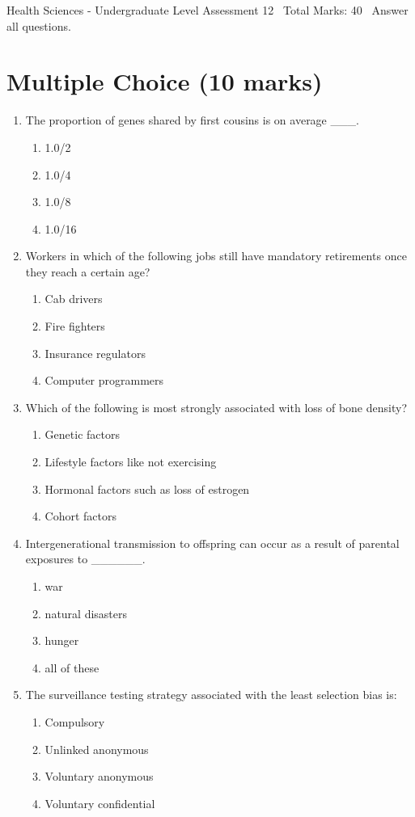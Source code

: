 \documentclass[12pt]{article}
\begin{document}
\begin{center}
Health Sciences - Undergraduate Level Assessment 12 \
Total Marks: 40 \
Answer all questions.
\end{center}

\section*{Multiple Choice (10 marks)}
\begin{enumerate}[label=\arabic*.]
\item The proportion of genes shared by first cousins is on average \_\_\_.
\begin{enumerate}[label=(\alph*)]
    \item 1.0/2
    \item 1.0/4
    \item 1.0/8
    \item 1.0/16
\end{enumerate}
\item Workers in which of the following jobs still have mandatory retirements once they reach a certain age?
\begin{enumerate}[label=(\alph*)]
    \item Cab drivers
    \item Fire fighters
    \item Insurance regulators
    \item Computer programmers
\end{enumerate}
\item Which of the following is most strongly associated with loss of bone density?
\begin{enumerate}[label=(\alph*)]
    \item Genetic factors
    \item Lifestyle factors like not exercising
    \item Hormonal factors such as loss of estrogen
    \item Cohort factors
\end{enumerate}
\item Intergenerational transmission to offspring can occur as a result of parental exposures to \_\_\_\_\_\_.
\begin{enumerate}[label=(\alph*)]
    \item war
    \item natural disasters
    \item hunger
    \item all of these
\end{enumerate}
\item The surveillance testing strategy associated with the least selection bias is:
\begin{enumerate}[label=(\alph*)]
    \item Compulsory
    \item Unlinked anonymous
    \item Voluntary anonymous
    \item Voluntary confidential
\end{enumerate}
\end{enumerate}
\end{document}
